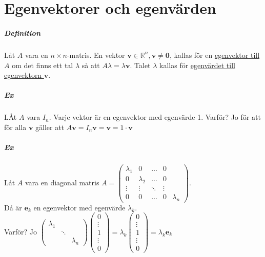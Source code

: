 \chapter{Egenvektorer och egenvärden}
\paragraph{Definition} Låt $A$ vara en $n\times n$-matris.
En vektor $\bm{v}\in\mathbb{R}^n,\bm{v}\neq\bm{0}$, kallas för en \underline{egenvektor till $A$} om det finns ett tal $\lambda$ så att $A\lambda=\lambda\bm{v}$.
Talet $\lambda$ kallas för \underline{egenvärdet till egenvektorn $\bm{v}$}.

\paragraph{Ex} LÅt $A$ vara $I_n$.
Varje vektor är en egenvektor med egenvärde 1.
Varför?
Jo för att för alla $\bm{v}$ gäller att $A\bm{v}=I_n\bm{v}=\bm{v}=1\cdot\bm{v}$

\paragraph{Ex} Låt $A$ vara en diagonal matris $A=
\begin{pmatrix}
    \lambda_1&0&\ldots&0\\
    0&\lambda_2&\ldots&0\\
    \vdots&\vdots&\ddots&\vdots\\
    0&0&\ldots&0&\lambda_n
\end{pmatrix}$.\\
Då är $\bm{e}_k$ en egenvektor med egenvärde $\lambda_k$.\\
Varför?
Jo $\begin{pmatrix}
    \lambda_1&&\\
    &\ddots&\\
    &&\lambda_n
\end{pmatrix}
\begin{pmatrix}
    0\\\vdots\\1\\\vdots\\0
\end{pmatrix}=
\lambda_k\begin{pmatrix}
    0\\\vdots\\1\\\vdots\\0
\end{pmatrix}=
\lambda_k\bm{e}_k$